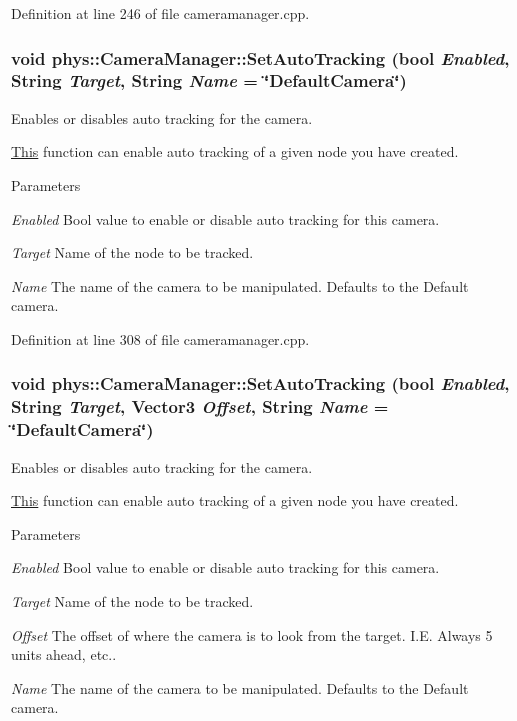 Definition at line 246 of file cameramanager.cpp.

\hypertarget{classphys_1_1CameraManager_a6edd94b6e8d9f2fa1e0b84554b367933}{
\subsubsection[{SetAutoTracking}]{\setlength{\rightskip}{0pt plus 5cm}void phys::CameraManager::SetAutoTracking (bool {\em Enabled}, \/  {\bf String} {\em Target}, \/  {\bf String} {\em Name} = {\ttfamily \char`\"{}DefaultCamera\char`\"{}})}}
\label{d9/d91/classphys_1_1CameraManager_a6edd94b6e8d9f2fa1e0b84554b367933}


Enables or disables auto tracking for the camera. 

\hyperlink{structThis}{This} function can enable auto tracking of a given node you have created. 
\begin{DoxyParams}{Parameters}
\item[{\em Enabled}]Bool value to enable or disable auto tracking for this camera. \item[{\em Target}]Name of the node to be tracked. \item[{\em Name}]The name of the camera to be manipulated. Defaults to the Default camera. \end{DoxyParams}


Definition at line 308 of file cameramanager.cpp.

\hypertarget{classphys_1_1CameraManager_a43d55c71817096add5dad1552239fc74}{
\subsubsection[{SetAutoTracking}]{\setlength{\rightskip}{0pt plus 5cm}void phys::CameraManager::SetAutoTracking (bool {\em Enabled}, \/  {\bf String} {\em Target}, \/  {\bf Vector3} {\em Offset}, \/  {\bf String} {\em Name} = {\ttfamily \char`\"{}DefaultCamera\char`\"{}})}}
\label{d9/d91/classphys_1_1CameraManager_a43d55c71817096add5dad1552239fc74}


Enables or disables auto tracking for the camera. 

\hyperlink{structThis}{This} function can enable auto tracking of a given node you have created. 
\begin{DoxyParams}{Parameters}
\item[{\em Enabled}]Bool value to enable or disable auto tracking for this camera. \item[{\em Target}]Name of the node to be tracked. \item[{\em Offset}]The offset of where the camera is to look from the target. I.E. Always 5 units ahead, etc.. \item[{\em Name}]The name of the camera to be manipulated. Defaults to the Default camera. \end{DoxyParams}


